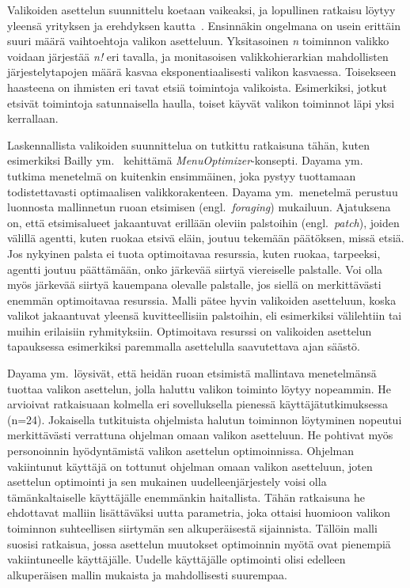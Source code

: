 \documentclass[finnish, 12pt, a4paper, elec, utf8, a-1b, online]{aaltothesis}
\begin{document}
Valikoiden asettelun suunnittelu koetaan vaikeaksi, ja lopullinen ratkaisu
löytyy yleensä yrityksen ja erehdyksen kautta~\cite{10.1145/2501988.2502024}.
Ensinnäkin ongelmana on usein erittäin suuri määrä vaihtoehtoja valikon
asetteluun. Yksitasoinen \textit{n} toiminnon valikko voidaan järjestää
\textit{n!} eri tavalla, ja monitasoisen valikkohierarkian mahdollisten
järjestelytapojen määrä kasvaa eksponentiaalisesti valikon kasvaessa. Toisekseen
haasteena on ihmisten eri tavat etsiä toimintoja valikoista. Esimerkiksi, jotkut
etsivät toimintoja satunnaisella haulla, toiset käyvät valikon toiminnot läpi
yksi kerrallaan.

Laskennallista valikoiden suunnittelua on tutkittu ratkaisuna tähän, kuten
esimerkiksi Bailly ym.~\cite{10.1145/2501988.2502024} kehittämä
\textit{MenuOptimizer}-konsepti. Dayama ym.~\cite{DAYAMA2021102624} tutkima
menetelmä on kuitenkin ensimmäinen, joka pystyy tuottamaan todistettavasti
optimaalisen valikkorakenteen. Dayama ym.~menetelmä perustuu luonnosta
mallinnetun ruoan etsimisen (engl.~\textit{foraging}) mukailuun. Ajatuksena on,
että etsimisalueet jakaantuvat erillään oleviin palstoihin
(engl.~\textit{patch}), joiden välillä agentti, kuten ruokaa etsivä eläin,
joutuu tekemään päätöksen, missä etsiä. Jos nykyinen palsta ei tuota
optimoitavaa resurssia, kuten ruokaa, tarpeeksi, agentti joutuu päättämään, onko
järkevää siirtyä viereiselle palstalle. Voi olla myös järkevää siirtyä kauempana
olevalle palstalle, jos siellä on merkittävästi enemmän optimoitavaa resurssia.
Malli pätee hyvin valikoiden asetteluun, koska valikot jakaantuvat yleensä
kuvitteellisiin palstoihin, eli esimerkiksi välilehtiin tai muihin erilaisiin
ryhmityksiin. Optimoitava resurssi on valikoiden asettelun tapauksessa
esimerkiksi paremmalla asettelulla saavutettava ajan säästö.

Dayama ym.~löysivät, että heidän ruoan etsimistä mallintava menetelmänsä tuottaa
valikon asettelun, jolla haluttu valikon toiminto löytyy nopeammin. He arvioivat
ratkaisuaan kolmella eri sovelluksella pienessä käyttäjätutkimuksessa (n=24).
Jokaisella tutkituista ohjelmista halutun toiminnon löytyminen nopeutui
merkittävästi verrattuna ohjelman omaan valikon asetteluun. He pohtivat myös
personoinnin hyödyntämistä valikon asettelun optimoinnissa. Ohjelman vakiintunut
käyttäjä on tottunut ohjelman omaan valikon asetteluun, joten asettelun
optimointi ja sen mukainen uudelleenjärjestely voisi olla tämänkaltaiselle
käyttäjälle enemmänkin haitallista. Tähän ratkaisuna he ehdottavat malliin
lisättäväksi uutta parametria, joka ottaisi huomioon valikon toiminnon
suhteellisen siirtymän sen alkuperäisestä sijainnista. Tällöin malli suosisi
ratkaisua, jossa asettelun muutokset optimoinnin myötä ovat pienempiä
vakiintuneelle käyttäjälle. Uudelle käyttäjälle optimointi olisi edelleen
alkuperäisen mallin mukaista ja mahdollisesti suurempaa.
\end{document}
